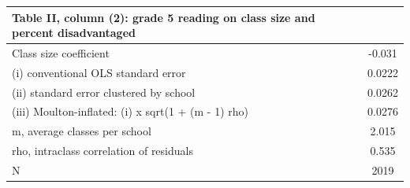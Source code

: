\begin{tabular}{lc}
\toprule
Table II, column (2): grade 5 reading on class size and percent disadvantaged & \\
\midrule
Class size coefficient & -0.031 \\
(i) conventional OLS standard error & 0.0222 \\
(ii) standard error clustered by school & 0.0262 \\
(iii) Moulton-inflated: (i) x sqrt(1 + (m - 1) rho) & 0.0276 \\
\midrule
m, average classes per school & 2.015 \\
rho, intraclass correlation of residuals & 0.535 \\
N & 2019 \\
\bottomrule
\end{tabular}
